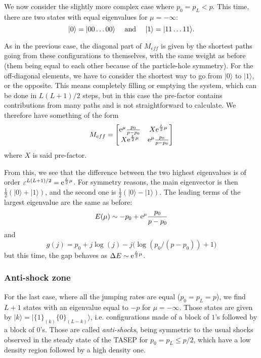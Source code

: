 \documentclass[aps,pre,onecolumn,showpacs,showkeys,a4paper]{revtex4-1}
\begin{document}
We now consider the slightly more complex case where $p_0=p_L<p$. This time, there are two states with equal eigenvalues for $\mu=-\infty$:
\begin{equation}\label{IV-3-P0}
|0\rangle=|00\dots00\rangle~~~~{\rm and}~~~~|1\rangle=|11\dots11\rangle.
\end{equation}

As in the previous case, the diagonal part of $M_{eff}$ is given by the shortest paths going from these configurations to themselves, with the same weight as before (them being equal to each other because of the particle-hole symmetry). For the off-diagonal elements, we have to consider the shortest way to go from $|0\rangle$ to $|1\rangle$, or the opposite. This means completely filling or emptying the system, which can be done in $L(L+1)/2$ steps, but in this case the pre-factor contains contributions from many paths and is not straightforward to calculate. We therefore have something of the form
\begin{equation}
M_{eff}=\begin{bmatrix} {\rm e}^{\mu}\frac{p_0}{p-p_0} &X {\rm e}^{\frac{L}{2}\mu}\\ X {\rm e}^{\frac{L}{2}\mu} &{\rm e}^{\mu}\frac{p_0}{p-p_0}  \end{bmatrix}
\end{equation}
where $X$ is said pre-factor.

From this, we see that the difference between the two highest eigenvalues is of order $\varepsilon^{L(L+1)/2}={\rm e}^{\frac{L}{2}\mu}$. For symmetry reasons, the main eigenvector is then $\frac{1}{2}(|0\rangle+|1\rangle)$, and the second one is $\frac{1}{2}(|0\rangle-|1\rangle)$. The leading terms of the largest eigenvalue are the same as before:
\begin{equation}\label{IV-3-EmuLDHD}
E(\mu)\sim -p_0+{\rm e}^{\mu}\frac{p_0}{p-p_0}
\end{equation}
and
\begin{equation}\label{IV-3-gjLDHD}\boxed{
g(j)=p_0+j\log(j)-j\bigl(\log(p_0/(p-p_0))+1\bigr)
}\end{equation}
but this time, the gap behaves as $\Delta E\sim{\rm e}^{\frac{L}{2}\mu}$.



\subsubsection{Anti-shock zone}
\label{IV-1-c}

For the last case, where all the jumping rates are equal ($p_0=p_L=p$), we find $L+1$ states with an eigenvalue equal to $-p$ for $\mu=-\infty$. Those states are given by $|k\rangle=|\{1\}_{(k)} \{0\}_{(L-k)}\rangle$, i.e. configurations made of a block of $1$'s followed by a block of $0$'s. Those are called \textit{anti-shocks}, being symmetric to the usual shocks observed in the steady state of the TASEP for $p_0=p_L\leq p/2$, which have a low density region followed by a high density one.
\end{document}

